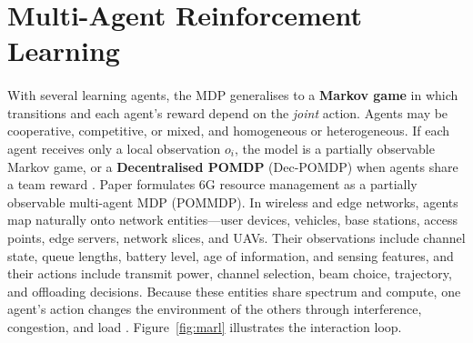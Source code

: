 \documentclass[12pt,a4paper,final]{extreport}
\begin{document}
\section{Multi-Agent Reinforcement Learning}

\paragraph{} With several learning agents, the MDP generalises to a \textbf{Markov game} in which transitions and each agent's reward depend on the \emph{joint} action. Agents may be cooperative, competitive, or mixed, and homogeneous or heterogeneous. If each agent receives only a local observation $o_i$, the model is a partially observable Markov game, or a \textbf{Decentralised POMDP} (Dec-POMDP) when agents share a team reward \cite{p3}. Paper \cite{p2} formulates 6G resource management as a partially observable multi-agent MDP (POMMDP). In wireless and edge networks, agents map naturally onto network entities---user devices, vehicles, base stations, access points, edge servers, network slices, and UAVs. Their observations include channel state, queue lengths, battery level, age of information, and sensing features, and their actions include transmit power, channel selection, beam choice, trajectory, and offloading decisions. Because these entities share spectrum and compute, one agent's action changes the environment of the others through interference, congestion, and load \cite{p3}. Figure~\ref{fig:marl} illustrates the interaction loop.
\end{document}
